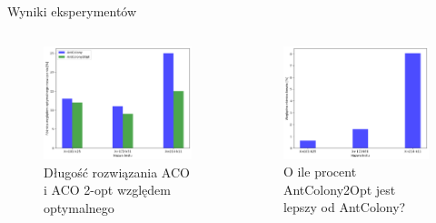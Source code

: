 \documentclass{beamer}
\begin{document}
\begin{frame}{Wyniki eksperymentów}
    \begin{columns}
        \begin{column}{0.55\textwidth}
            \begin{figure}
                \centering
                \includegraphics[width=\linewidth]{../report/img/2opt_wzgledem_optymalnego.png}
                \caption{Długość rozwiązania ACO i ACO 2-opt względem optymalnego}
            \end{figure}        
        \end{column}
        \begin{column}{0.55\textwidth}
            \begin{figure}
                \centering
                \includegraphics[width=\linewidth]{../report/img/2opt_wzgledem_zwyklego.png}
                \caption{O ile procent AntColony2Opt jest lepszy od AntColony?}
            \end{figure}        
        \end{column}
    \end{columns}
\end{frame}
\end{document}

